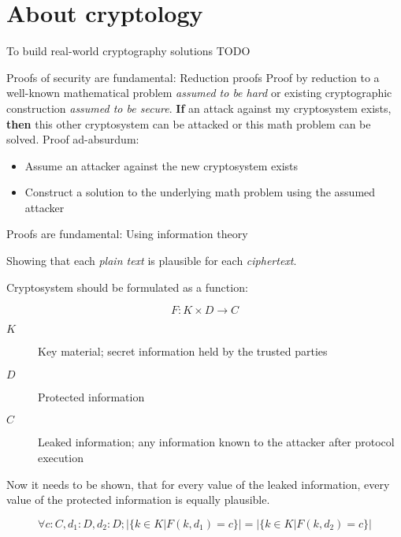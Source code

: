 \section{About cryptology}

\begin{frame}{To build real-world cryptography solutions}
  TODO
\end{frame}

\begin{frame}{Proofs of security are fundamental: Reduction proofs}
  \small
  Proof by reduction to a well-known mathematical problem \emph{assumed to be hard} or existing cryptographic construction \emph{assumed to be secure}.
  \vfill
  \textbf{If} an attack against my cryptosystem exists,
  \\ \textbf{then} this other cryptosystem can be attacked or this math problem can be solved.
  \vfill
  Proof ad-absurdum:
  \begin{itemize}
    \item Assume an attacker against the new cryptosystem exists
    \item Construct a solution to the underlying math problem using the assumed attacker
  \end{itemize}
\end{frame}

\begin{frame}{Proofs are fundamental: Using information theory}
  \small

  Showing that each \emph{plain text} is plausible for each \emph{ciphertext}.

  \vfill

  Cryptosystem should be formulated as a function:

  $$F : K \times D \to C$$

  \begin{description}
    \item[$K$] Key material; secret information held by the trusted parties
    \item[$D$] Protected information
    \item[$C$] Leaked information; any information known to the attacker after protocol execution
  \end{description}

  Now it needs to be shown, that for every value of the leaked information,
  every value of the protected information is equally plausible.


  $$\forall c : C, d_1 : D, d_2 : D; |\{ k \in K | F(k, d_1) = c \}| = |\{ k \in K | F(k, d_2) = c \}|$$
\end{frame}

